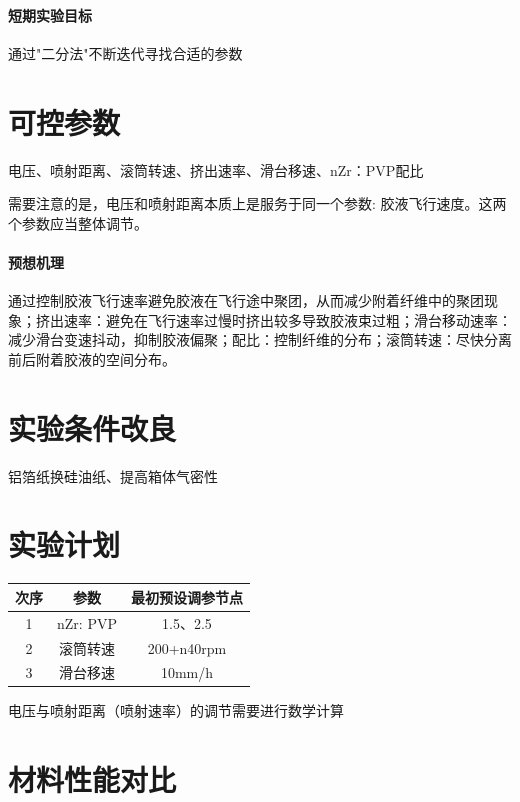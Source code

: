 ﻿\paragraph{短期实验目标}通过"二分法"不断迭代寻找合适的参数

\section{可控参数}

电压、喷射距离、滚筒转速、挤出速率、滑台移速、nZr：PVP配比

需要注意的是，电压和喷射距离本质上是服务于同一个参数: 胶液飞行速度。这两个参数应当整体调节。

\paragraph{预想机理}通过控制胶液飞行速率避免胶液在飞行途中聚团，从而减少附着纤维中的聚团现象；挤出速率：避免在飞行速率过慢时挤出较多导致胶液束过粗；滑台移动速率：减少滑台变速抖动，抑制胶液偏聚；配比：控制纤维的分布；滚筒转速：尽快分离前后附着胶液的空间分布。

\section{实验条件改良}

铝箔纸换硅油纸、提高箱体气密性

\section{实验计划}

\begin{tabular}{|ccc|}
    \hline
    次序&参数&最初预设调参节点\\\hline
    1&nZr: PVP&1.5、2.5\\\hline
    2&滚筒转速&200+n40rpm\\\hline
    3&滑台移速&10mm/h\\\hline
\end{tabular}

电压与喷射距离（喷射速率）的调节需要进行数学计算






\section{材料性能对比}


